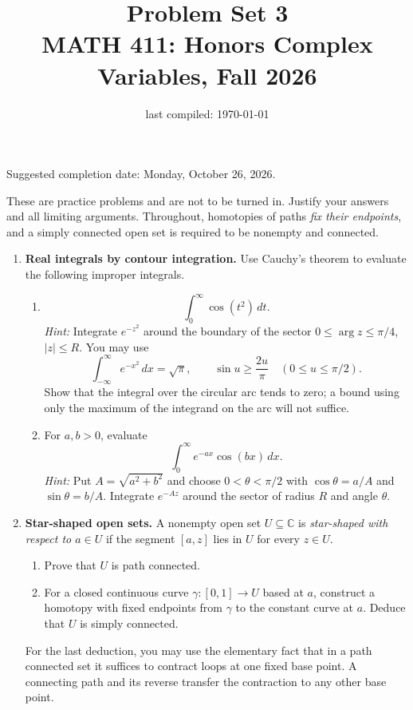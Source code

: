 \documentclass[12pt,reqno]{amsart}
\title{Problem Set 3 \\ MATH 411: Honors Complex Variables, Fall 2026}
\date{last compiled: \today}
\newcommand{\C}{\mathbb{C}}
\begin{document}
\maketitle

\begin{center}
Suggested completion date: Monday, October 26, 2026.
\end{center}

These are practice problems and are not to be turned in. Justify your
answers and all limiting arguments. Throughout, homotopies of paths
\emph{fix their endpoints}, and a simply connected open set is required
to be nonempty and connected.

\begin{enumerate}

\item \textbf{Real integrals by contour integration.}
Use Cauchy's theorem to evaluate the following improper integrals.
\begin{enumerate}
\item
\[
 \int_0^\infty \cos(t^2)\,dt.
\]
\emph{Hint:} Integrate $e^{-z^2}$ around the boundary of the sector
$0\leq\arg z\leq\pi/4$, $|z|\leq R$.
You may use
\[
 \int_{-\infty}^{\infty}e^{-x^2}\,dx=\sqrt{\pi},\qquad
 \sin u\geq\frac{2u}{\pi}\quad(0\leq u\leq\pi/2).
\]
Show that the integral over the circular arc tends to zero; a bound
using only the maximum of the integrand on the arc will not suffice.
\item For $a,b>0$, evaluate
\[
 \int_0^\infty e^{-ax}\cos(bx)\,dx.
\]
\emph{Hint:} Put $A=\sqrt{a^2+b^2}$ and choose
$0<\theta<\pi/2$ with $\cos\theta=a/A$ and $\sin\theta=b/A$.
Integrate $e^{-Az}$ around the sector of radius $R$ and angle $\theta$.
\end{enumerate}

\item \textbf{Star-shaped open sets.}
A nonempty open set $U\subseteq\C$ is \emph{star-shaped with respect
to $a\in U$} if the segment $[a,z]$ lies in $U$ for every $z\in U$.
\begin{enumerate}
\item Prove that $U$ is path connected.
\item For a closed continuous curve $\gamma:[0,1]\to U$ based at $a$,
construct a homotopy with fixed endpoints from $\gamma$ to the constant
curve at $a$. Deduce that $U$ is simply connected.
\end{enumerate}
For the last deduction, you may use the elementary fact that in a path
connected set it suffices to contract loops at one fixed base point.
A connecting path and its reverse transfer the contraction to any
other base point.


\end{enumerate}
\end{document}
